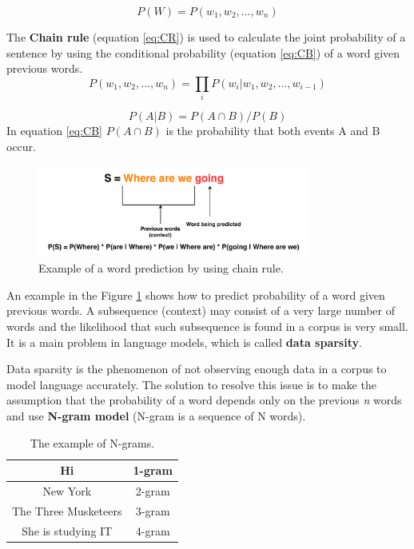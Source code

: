 \begin{equation} \label{eq:LM}
P(W) = P(w_1, w_2, ..., w_n)
\end{equation}

The \textbf{Chain rule} (equation \ref{eq:CR}) is used to calculate the joint probability of a sentence by using the conditional probability (equation \ref{eq:CB}) of a word given previous words. 
\begin{equation} \label{eq:CR}
P(w_1, w_2,..., w_n) = \prod_{i}P(w_i|w_1, w_2,...,w_{i-1})
\end{equation}

\begin{equation} \label{eq:CB}
P(A|B) = P(A \cap B) / P(B)
\end{equation}
In equation \ref{eq:CB} $P(A \cap B)$ is the probability that both events A and B occur.

\begin{figure}[hbt]
  \centering
  \includegraphics[width=0.8\textwidth]{figures/lm.pdf}
  \caption{Example of a word prediction by using chain rule.}
  \label{chain_rule}
\end{figure}

An example in the Figure \ref{chain_rule} shows how to predict probability of a word given previous words. A subsequence (context) may consist of a very large number of words and the likelihood that such subsequence is found in a corpus is very small. It is a main problem in language models, which is called \textbf{data sparsity}.

Data sparsity is the phenomenon of not observing enough data in a corpus to model language accurately. The solution to resolve this issue is to make the assumption that the probability of a word depends only on the previous \textit{n} words and use \textbf{N-gram model} (N-gram is a sequence of N words).

\begin{table}[ht]
  \centering
   \begin{tabular}{|c|c|} 
   \hline
    Hi & 1-gram \\
   \hline
    New York & 2-gram \\
   \hline
   The Three Musketeers & 3-gram \\
   \hline
   She is studying IT & 4-gram \\
   \hline
   \end{tabular}
   \caption{The example of N-grams.}
  \label{tab:n_gram}
\end{table}

